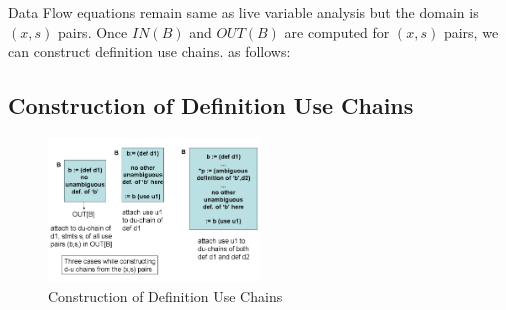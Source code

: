 \documentclass{article}
\begin{document}
Data Flow equations remain same as live variable analysis but the domain is $(x,s)$ pairs. Once $IN(B)$ and $OUT(B)$ are computed for $(x,s)$ pairs, we can construct definition use chains. as follows: \\

\subsection*{Construction of Definition Use Chains}

\begin{figure}[h]
    \centering
    \includegraphics[width=0.5\textwidth]{Images/duchain2.png}
    \caption{Construction of Definition Use Chains}
    \label{fig:DefUse}
\end{figure}
\end{document}
